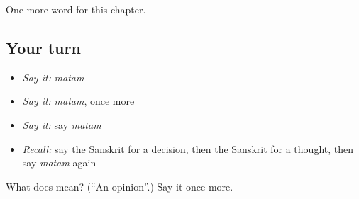 \begin{grammarlens}[title={What you've built}]
One more word for this chapter.
\end{grammarlens}

\subsection*{Your turn}
\begin{itemize}
\raggedright
  \item \emph{Say it:} \emph{matam}
  \item \emph{Say it:} \emph{matam}, once more
  \item \emph{Say it:} say \emph{matam}
  \item \emph{Recall:} say the Sanskrit for a decision, then the Sanskrit for a thought, then say \emph{matam} again
\end{itemize}

\begin{tcolorbox}[breakable,colback=teal!4,colframe=teal!35!black,title={Before you move on}]
What does  mean? (\textquotedblleft{}An opinion\textquotedblright{}.) Say it once more.
\end{tcolorbox}
